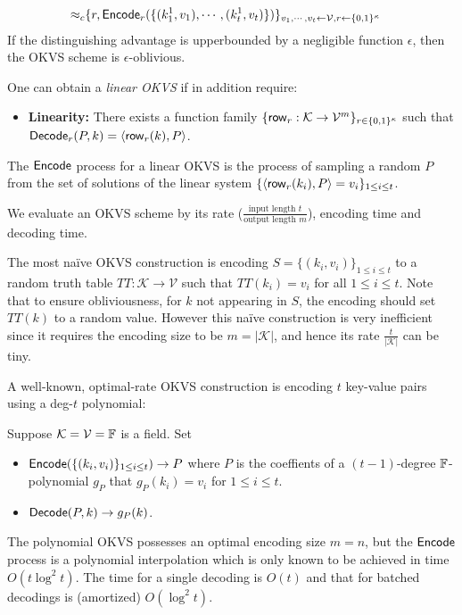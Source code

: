 \begin{definition}
\begin{itemize}
\begin{align*}
    \approx_c &\{r, {\sf Encode}_r(\{(k_1^1,v_1),\cdots,(k_t^1,v_t)\})\}_{v_1,\cdots,v_t\leftarrow \mathcal{V},r\leftarrow\{0,1\}^\kappa}
  \end{align*}
  If the distinguishing advantage is upperbounded by a negligible function $\epsilon$, then the OKVS scheme is $\epsilon$-oblivious. 
  \end{itemize}
One can obtain a \emph{linear OKVS} if in addition require:
\begin{itemize}
  \item \textbf{Linearity: }There exists a function family $\{{\sf row}_r:\mathcal{K}\rightarrow\mathcal{V}^m\}_{r\in\{0,1\}^\kappa}$ such that ${\sf Decode}_r(P,k) = \langle {\sf row}_r(k), P \rangle$. 
\end{itemize}
\end{definition}
The ${\sf Encode}$ process for a linear OKVS is the process of sampling a random $P$ from the set of solutions of the linear system $\{\langle {\sf row}_r(k_i), P \rangle = v_i\}_{1\le i\le t}$. 

We evaluate an OKVS scheme by its rate ($\frac{\text{input length }t}{\text{output length }m}$), encoding time and decoding time. 

The most na\"ive OKVS construction is encoding $S = \{(k_i, v_i)\}_{1\le i\le t}$ to a random truth table $TT:\mathcal{K}\rightarrow \mathcal{V}$ such that $TT(k_i) = v_i$ for all $1\le i\le t$. Note that to ensure obliviousness, for $k$ not appearing in $S$, the encoding should set $TT(k)$ to a random value. However this na\"ive construction is very inefficient since it requires the encoding size to be $m=|\mathcal{K}|$, and hence its rate $\frac{t}{|\mathcal{K}|}$ can be tiny. 

A well-known, optimal-rate OKVS construction is encoding $t$ key-value pairs using a deg-$t$ polynomial: 
\begin{construction}[Polynomial]\label{con:OKVS_polynomial}
  Suppose $\mathcal{K} = \mathcal{V}=\mathbb{F}$ is a field. Set 
  \begin{itemize}
    \item ${\sf Encode}(\{(k_i,v_i)\}_{1\le i\le t}) \rightarrow P$ where $P$ is the coeffients of a $(t-1)$-degree $\mathbb{F}$-polynomial $g_P$ that $g_P(k_i) = v_i$ for $1\le i\le t$. 
    \item ${\sf Decode}(P,k)\rightarrow g_P(k)$. 
  \end{itemize}
\end{construction}
The polynomial OKVS possesses an optimal encoding size $m=n$, but the ${\sf Encode}$ process is a polynomial interpolation which is only known to be achieved in time $O(t\log^2t)$. The time for a single decoding is $O(t)$ and that for batched decodings is (amortized) $O(\log^2 t)$. 

